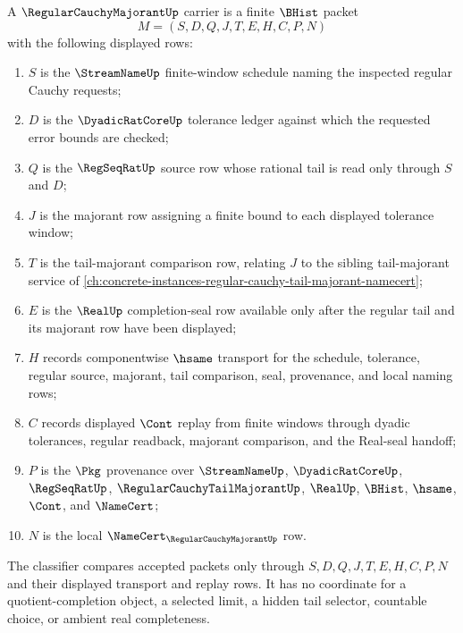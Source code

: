 \begin{definition}
\label{def:regular-cauchy-majorant-carrier}
A $\RegularCauchyMajorantUp$ carrier is a finite $\BHist$ packet
$$
M=(S,D,Q,J,T,E,H,C,P,N)
$$
with the following displayed rows:
\begin{enumerate}
\item $S$ is the $\StreamNameUp$ finite-window schedule naming the inspected regular Cauchy requests;
\item $D$ is the $\DyadicRatCoreUp$ tolerance ledger against which the requested error bounds are checked;
\item $Q$ is the $\RegSeqRatUp$ source row whose rational tail is read only through $S$ and $D$;
\item $J$ is the majorant row assigning a finite bound to each displayed tolerance window;
\item $T$ is the tail-majorant comparison row, relating $J$ to the sibling tail-majorant service of \autoref{ch:concrete-instances-regular-cauchy-tail-majorant-namecert};
\item $E$ is the $\RealUp$ completion-seal row available only after the regular tail and its majorant row have been displayed;
\item $H$ records componentwise $\hsame$ transport for the schedule, tolerance, regular source, majorant, tail comparison, seal, provenance, and local naming rows;
\item $C$ records displayed $\Cont$ replay from finite windows through dyadic tolerances, regular readback, majorant comparison, and the Real-seal handoff;
\item $P$ is the $\Pkg$ provenance over $\StreamNameUp$, $\DyadicRatCoreUp$, $\RegSeqRatUp$, $\RegularCauchyTailMajorantUp$, $\RealUp$, $\BHist$, $\hsame$, $\Cont$, and $\NameCert$;
\item $N$ is the local $\NameCert_{\RegularCauchyMajorantUp}$ row.
\end{enumerate}
The classifier compares accepted packets only through $S,D,Q,J,T,E,H,C,P,N$ and their displayed transport and replay rows. It has no coordinate for a quotient-completion object, a selected limit, a hidden tail selector, countable choice, or ambient real completeness.
\end{definition}

